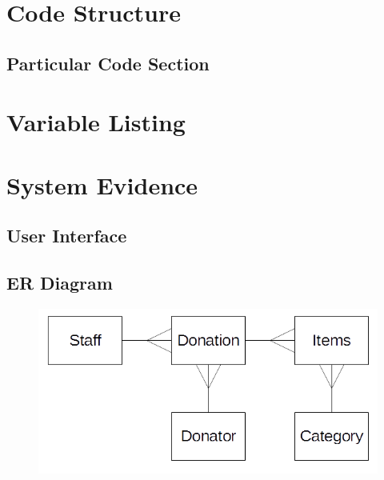 \section{Code Structure}

\subsection{Particular Code Section}

\section{Variable Listing}

\section{System Evidence}

\subsection{User Interface}

\subsection{ER Diagram}
\begin{figure}[H]
    \includegraphics[width=\textwidth]{./Maintenance/Images/ERDiagram.png}
\end{figure}

